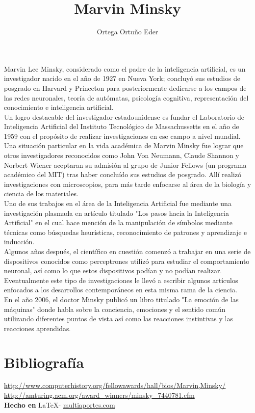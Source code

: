 \documentclass{article}
\title{Marvin Minsky}
\author{Ortega Ortu\~no Eder}
\date{} %
\begin{document}
	\maketitle
	\normalsize{
Marvin Lee Minsky, considerado como el padre de la inteligencia artificial, es un investigador nacido en el año de 1927 en Nueva York; concluyó sus estudios de posgrado en Harvard y Princeton para posteriormente dedicarse a los campos de las redes neuronales, teoría de autómatas, psicología cognitiva, representación del conocimiento e inteligencia artificial.
\\

Un logro destacable del investigador estadounidense es fundar el Laboratorio de Inteligencia Artificial del Instituto Tecnológico de Massachussetts en el año de 1959 con el propósito de realizar investigaciones en ese campo a nivel mundial.
\\

Una situación particular en la vida académica de Marvin Minsky fue lograr que otros investigadores reconocidos como John Von Neumann, Claude Shannon y Norbert Wiener aceptaran su admisión al grupo de Junior Fellows (un programa académico del MIT) tras haber concluído sus estudios de posgrado. Allí realizó investigaciones con microscopios, para más tarde enfocarse al área de la biología y ciencia de los materiales.
\\

Uno de sus trabajos en el área de la Inteligencia Artificial fue mediante una investigación plasmada en artículo titulado "Los pasos hacia la Inteligencia Artificial" en el cual hace mención de la manipulación de símbolos mediante técnicas como búsquedas heurísticas, reconocimiento de patrones y aprendizaje e inducción.
\\

Algunos años después, el científico en cuestión comenzó a trabajar en una serie de dispositivos conocidos como perceptrones utilizó para estudiar el comportamiento neuronal, así como lo que estos dispositivos podían y no podían realizar. Eventualmente este tipo de investigaciones le llevó a escribir algunos artículos enfocados a los desarrollos contemporáneos en esta misma rama de la ciencia.
\\

En el año 2006, el doctor Minsky publicó un libro titulado "La emoción de las máquinas" donde habla sobre la conciencia, emociones y el sentido común utilizando diferentes puntos de vista así como las reacciones instintivas y las reacciones aprendidas.

}

\vspace{1cm}

\section*{Bibliograf\'ia}

\noindent \url{http://www.computerhistory.org/fellowawards/hall/bios/Marvin,Minsky/}
\\
\noindent \url{http://amturing.acm.org/award_winners/minsky_7440781.cfm}
\\

\large{\hfill \textbf{Hecho en } \LaTeX - \url{multiaportes.com}}
\end{document}
